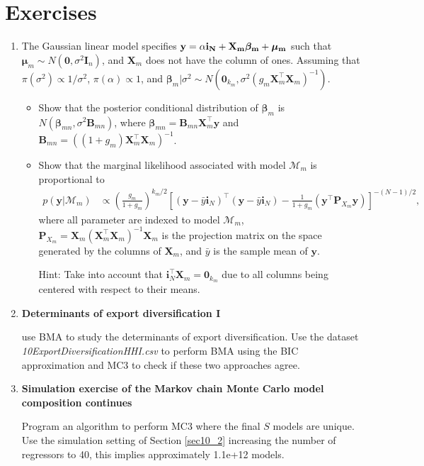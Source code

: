 \section{Exercises}\label{sec10_6}

\begin{enumerate}
	\item The Gaussian linear model specifies $\bf{y}=\alpha\bm{i}_N+\bm{X}_m\bm{\beta}_m+\bm{\mu}_m$ such that $\bm{\mu}_m\sim{N}(\bm{0},\sigma^2\bm{I}_n)$, and $\bm{X}_m$ does not have the column of ones. Assuming that $\pi(\sigma^2)\propto 1/{\sigma^2}$, $\pi(\alpha)\propto 1$, and $\bm{\beta}_m|\sigma^2 \sim {N}(\bm{0}_{k_m}, \sigma^2 (g_m\bm{X}_m^{\top}\bm{X}_m)^{-1})$.
	\begin{itemize}
		\item Show that the posterior conditional distribution of $\bm{\beta}_m$ is $N(\bm{\beta}_{mn},\sigma^2\bm{B}_{mn})$, where $\bm{\beta}_{mn}=\bm{B}_{mn}\bm{X}_m^{\top}\bm{y}$ and $\bm{B}_{mn}=((1+g_m)\bm{X}_m^{\top}\bm{X}_m)^{-1}$.
		\item Show that the marginal likelihood associated with model $\mathcal{M}_m$ is proportional to
		\begin{align*}
			p(\bm{y}|\mathcal{M}_m)&\propto \left(\frac{g_m}{1+g_m}\right)^{k_m/2} \left[(\bm{y}-\bar{y}\bm{i}_N)^{\top}(\bm{y}-\bar{y}\bm{i}_N)-\frac{1}{1+g_m}(\bm{y}^{\top}\bm{P}_{X_m}\bm{y})\right]^{-(N-1)/2},
		\end{align*}
		where all parameter are indexed to model $\mathcal{M}_m$, $\bm{P}_{X_m}=\bm{X}_m(\bm{X}_m^{\top}\bm{X}_m)^{-1}\bm{X}_m$ is the projection matrix on the space generated by the columns of $\bm{X}_m$, and $\bar{y}$ is the sample mean of $\bm{y}$.
		
		Hint: Take into account that $\bm{i}_N^{\top}\bm{X}_m=\bm{0}_{k_m}$ due to all columns being centered with respect to their means.
	\end{itemize}

\item \textbf{Determinants of export diversification I}

\cite{Jetter2015} use BMA to study the determinants of export diversification. Use the dataset \textit{10ExportDiversificationHHI.csv} to perform BMA using the BIC approximation and MC3 to check if these two approaches agree. 

\item \textbf{Simulation exercise of the Markov chain Monte Carlo model composition continues}

Program an algorithm to perform MC3 where the final $S$ models are unique. Use the simulation setting of Section \ref{sec10_2} increasing the number of regressors to 40, this implies approximately 1.1e+12 models.


\end{enumerate}

